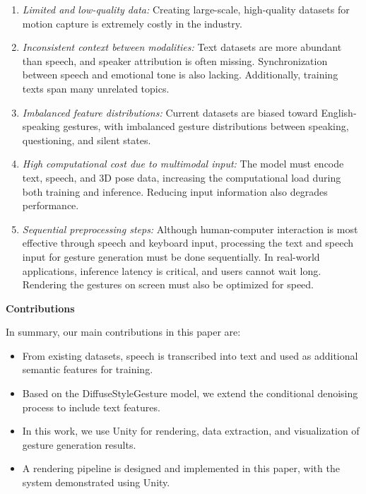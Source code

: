 \begin{enumerate}
	\item \textit{Limited and low-quality data:} Creating large-scale, high-quality datasets for motion capture is extremely costly in the industry.
	
	\item \textit{Inconsistent context between modalities:} Text datasets are more abundant than speech, and speaker attribution is often missing. Synchronization between speech and emotional tone is also lacking. Additionally, training texts span many unrelated topics.
	
	\item \textit{Imbalanced feature distributions:} Current datasets are biased toward English-speaking gestures, with imbalanced gesture distributions between speaking, questioning, and silent states.
	
	\item \textit{High computational cost due to multimodal input:} The model must encode text, speech, and 3D pose data, increasing the computational load during both training and inference. Reducing input information also degrades performance.
	
	\item \textit{Sequential preprocessing steps:} Although human-computer interaction is most effective through speech and keyboard input, processing the text and speech input for gesture generation must be done sequentially. In real-world applications, inference latency is critical, and users cannot wait long. Rendering the gestures on screen must also be optimized for speed.
\end{enumerate}

\large \textbf{Contributions}

 In summary, our main contributions in this paper are:
 
\begin{itemize}
	\item From existing datasets, speech is transcribed into text and used as additional semantic features for training.
	
	\item Based on the DiffuseStyleGesture model, we extend the conditional denoising process to include text features.
	
	\item In this work, we use Unity for rendering, data extraction, and visualization of gesture generation results.
	
	\item A rendering pipeline is designed and implemented in this paper, with the system demonstrated using Unity.
\end{itemize}



